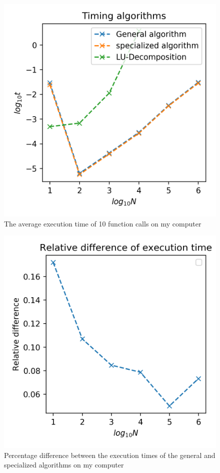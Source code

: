\documentclass[10pt,showpacs,preprintnumbers,footinbib,amsmath,amssymb,aps,prl,twocolumn,groupedaddress,superscriptaddress,showkeys]{revtex4-1}
\begin{document}
  \begin{figure}[hbtp]
    \center
    \includegraphics[scale=.7]{figs/ex1d_time.png}
    \caption{The average execution time of 10 function calls on my computer}
  \end{figure}

  \begin{figure}[hbtp]
    \center
    \includegraphics[scale=.7]{figs/ex1d_timediff.png}
    \caption{Percentage difference between the execution times of the general and specialized algorithms on my computer}
  \end{figure}
\end{document}
